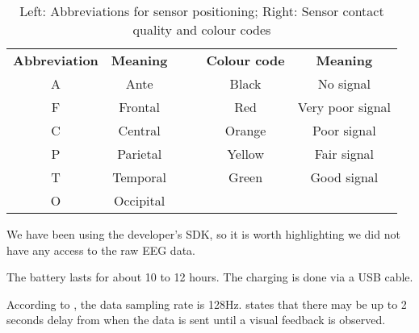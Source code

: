\begin{table}[h]
\centering
\begin{tabular}{|c|c|llcc}
\cline{1-2} \cline{5-6}
\textbf{Abbreviation} & \textbf{Meaning} &  & \multicolumn{1}{l|}{} & \multicolumn{1}{c|}{\textbf{Colour code}}          & \multicolumn{1}{c|}{\textbf{Meaning}} \\ \cline{1-2} \cline{5-6} 
A                     & Ante             &  & \multicolumn{1}{l|}{} & \multicolumn{1}{c|}{Black}                         & \multicolumn{1}{c|}{No signal}        \\ \cline{1-2} \cline{5-6} 
F                     & Frontal          &  & \multicolumn{1}{l|}{} & \multicolumn{1}{c|}{{\color[HTML]{FE0000} Red}}    & \multicolumn{1}{c|}{Very poor signal} \\ \cline{1-2} \cline{5-6} 
C                     & Central          &  & \multicolumn{1}{l|}{} & \multicolumn{1}{c|}{{\color[HTML]{F8A102} Orange}} & \multicolumn{1}{c|}{Poor signal}      \\ \cline{1-2} \cline{5-6} 
P                     & Parietal         &  & \multicolumn{1}{l|}{} & \multicolumn{1}{c|}{{\color[HTML]{F8FF00} Yellow}} & \multicolumn{1}{c|}{Fair signal}      \\ \cline{1-2} \cline{5-6} 
T                     & Temporal         &  & \multicolumn{1}{l|}{} & \multicolumn{1}{c|}{{\color[HTML]{32CB00} Green}}  & \multicolumn{1}{c|}{Good signal}      \\ \cline{1-2} \cline{5-6} 
O                     & Occipital        &  &                       & \multicolumn{1}{l}{}                               & \multicolumn{1}{l}{}                  \\ \cline{1-2}
\end{tabular}
\caption {Left: Abbreviations for sensor positioning; Right: Sensor contact quality and colour codes}
\label{table:sensorName}
\end{table}

We have been using the developer's SDK, so it is worth highlighting we did not have any access to the raw EEG data. 

The battery lasts for about 10 to 12 hours. The charging is done via a USB cable.

According to \cite{experimenterEPOC}, the data sampling rate is 128Hz. \cite{emotivUserManual} states that there may be up to 2 seconds delay from when the data is sent until a visual feedback is observed. 

